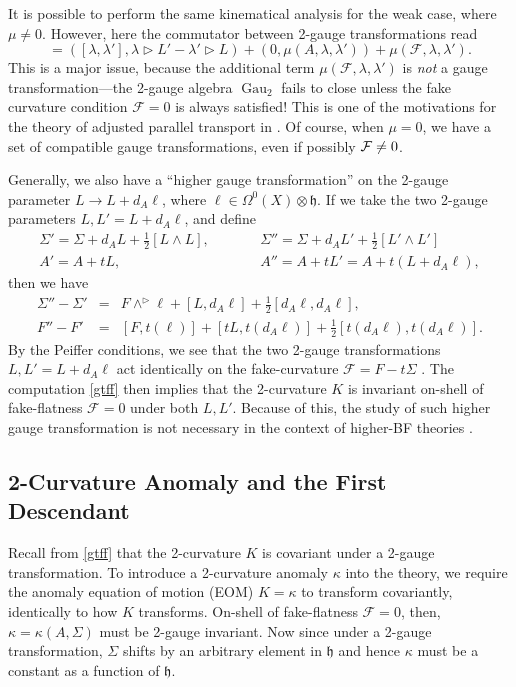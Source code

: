 \documentclass[onecolumn]{article}
\theoremstyle{theorem}
\theoremstyle{remark}
\theoremstyle{example}
\theoremstyle{definition}
\numberwithin{equation}{section}
\def\h{\mathfrak h}
\newcommand{\cF}{{\cal F}}
\begin{document}
It is possible to perform the same kinematical analysis for the weak case, where $\mu\neq 0$. However, here the commutator between 2-gauge transformations read \cite{Kim:2019owc}
\begin{equation}
    [(\lambda,L),(\lambda',L')] = ([\lambda,\lambda'],\lambda\rhd L' - \lambda'\rhd L) + (0,\mu(A,\lambda,\lambda')) + \mu(\mathcal{F},\lambda,\lambda'). \label{weakgaugeproblems}
\end{equation}
{This} is a major issue, because the additional term $\mu(\mathcal{F},\lambda,\lambda')$ is {\it {not}} a gauge transformation---the 2-gauge algebra $\operatorname{Gau}_2$ fails to close unless the fake curvature condition $\mathcal{F}=0$ is always satisfied! This is one of the motivations for the theory of adjusted parallel transport in \cite{Kim:2019owc}. Of course, when $\mu=0$, we have a set of compatible gauge transformations, even if possibly  $\cF\neq 0$. 


Generally, we also have a ``higher gauge transformation'' on the 2-gauge parameter $L\rightarrow L+d_A\ell$, where $\ell\in \Omega^0(X)\otimes\mathfrak{h}$. If we take the two 2-gauge parameters $L,L'=L+d_A\ell$, and define 
\begin{eqnarray}
    \Sigma' =\Sigma + d_AL + \frac{1}{2}[L\wedge L],&\qquad& \Sigma'' =\Sigma + d_AL' + \frac{1}{2}[L'\wedge L']\nonumber\\
    A' = A + tL,&\qquad& A'' = A + tL' = A+t(L+d_A\ell),\nonumber
\end{eqnarray}
then we have
\begin{eqnarray}
    \Sigma'' - \Sigma' &=& F\wedge^{\rhd}\ell+ [L,d_A\ell]+\frac{1}{2}[d_A\ell,d_A\ell],\nonumber\\
    F''-F' &=& [F,t(\ell)]+[tL,t(d_A\ell)]+ \frac{1}{2}[t(d_A\ell),t(d_A\ell)].\nonumber
\end{eqnarray}
{By} the Peiffer conditions, we see that the two 2-gauge transformations $L,L'=L+d_A\ell$ act identically on the fake-curvature $\mathcal{F} = F - t\Sigma$ \cite{Kapustin:2013uxa,Bochniak:2020vil}. The computation  \eqref{gtff} then implies that the 2-curvature $K$ is invariant on-shell of fake-flatness $\mathcal{F}=0$ under both $L,L'$. Because of this, the study of such higher gauge transformation is not necessary in the context of higher-BF theories \cite{Martins:2010ry}. 



\subsection{2-Curvature Anomaly and the First Descendant}\label{twisting} 
Recall from \eqref{gtff} that the 2-curvature $K$ is covariant under a 2-gauge transformation. To introduce a 2-curvature anomaly $\kappa$ into the theory, we require the anomaly equation of motion (EOM) $K=\kappa$ to transform covariantly, identically to how $K$ transforms. On-shell of fake-flatness $\mathcal{F}=0$, then, $\kappa=\kappa(A,\Sigma)$ must be 2-gauge invariant. Now since under a 2-gauge transformation, $\Sigma$ shifts by an arbitrary element in $\h$ and hence $\kappa$ must be a constant as a function of $\h$. 
\end{document}
